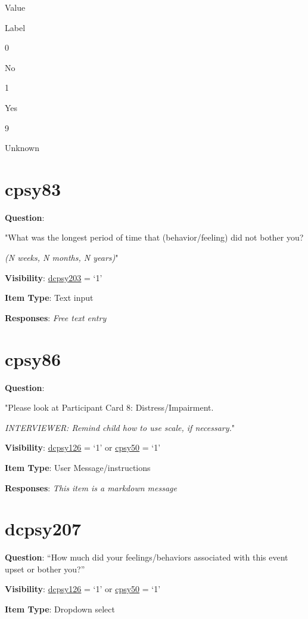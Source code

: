 \documentclass[]{book}
\begin{document}
Value

Label

0

No

1

Yes

9

Unknown

\hypertarget{cpsy83}{%
\section{cpsy83}\label{cpsy83}}

\textbf{Question}:

"What was the longest period of time that (behavior/feeling) did not bother you?

\emph{(N weeks, N months, N years)}"

\textbf{Visibility}: \protect\hyperlink{dcpsy203}{dcpsy203} = `1'

\textbf{Item Type}: Text input

\textbf{Responses}: \emph{Free text entry}

\hypertarget{cpsy86}{%
\section{cpsy86}\label{cpsy86}}

\textbf{Question}:

"Please look at Participant Card 8: Distress/Impairment.

\emph{INTERVIEWER: Remind child how to use scale, if necessary.}"

\textbf{Visibility}: \protect\hyperlink{dcpsy126}{dcpsy126} = `1' or \protect\hyperlink{cpsy50}{cpsy50} = `1'

\textbf{Item Type}: User Message/instructions

\textbf{Responses}: \emph{This item is a markdown message}

\hypertarget{dcpsy207}{%
\section{dcpsy207}\label{dcpsy207}}

\textbf{Question}: ``How much did your feelings/behaviors associated with this event upset or bother you?''

\textbf{Visibility}: \protect\hyperlink{dcpsy126}{dcpsy126} = `1' or \protect\hyperlink{cpsy50}{cpsy50} = `1'

\textbf{Item Type}: Dropdown select
\end{document}

